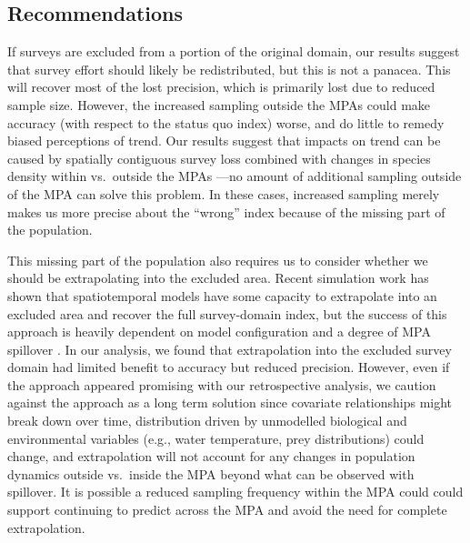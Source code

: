 \documentclass[12pt]{article}
\newcommand{\R}[1]{\label{#1}\linelabel{#1}}
\begin{document}
\begin{spacing}{1.4}
\subsection*{Recommendations}

If surveys are excluded from a portion of the original domain, our results suggest that survey effort should likely be redistributed, but this is not a panacea.
This will recover most of the lost precision, which is primarily lost due to reduced sample size.
However, the increased sampling outside the MPAs could make accuracy (with respect to the status quo index) worse, and do little to remedy biased perceptions of trend.
Our results suggest that impacts on trend can be caused by spatially contiguous survey loss combined with changes in species density within vs.\ outside the MPAs \citep[a form of spatially varying population trends,][]{barnett2021a}---no amount of additional sampling outside of the MPA can solve this problem.
In these cases, increased sampling merely makes us more precise about the ``wrong'' index because of the missing part of the population.

\R{E1}This missing part of the population also requires us to consider whether
we should be extrapolating into the excluded area. Recent simulation work has
shown that spatiotemporal models have some capacity to extrapolate into an
excluded area and recover the full survey-domain index, but the success of this
approach is heavily dependent on model configuration and a degree of MPA
spillover \citep{yalcin2023}. In our analysis, we found that extrapolation into
the excluded survey domain had limited benefit to accuracy but reduced
precision. However, even if the approach appeared promising with our
retrospective analysis, we caution against the approach as a long term solution
\R{A1} since covariate relationships might break down over time, distribution
driven by unmodelled biological and environmental variables (e.g., water
temperature, prey distributions) could change, and extrapolation will not
account for any changes in population dynamics outside vs.\ inside the MPA
beyond what can be observed with spillover. It is possible a reduced sampling
frequency within the MPA could could support continuing to predict across the
MPA and avoid the need for complete extrapolation.


\end{spacing}
\end{document}
